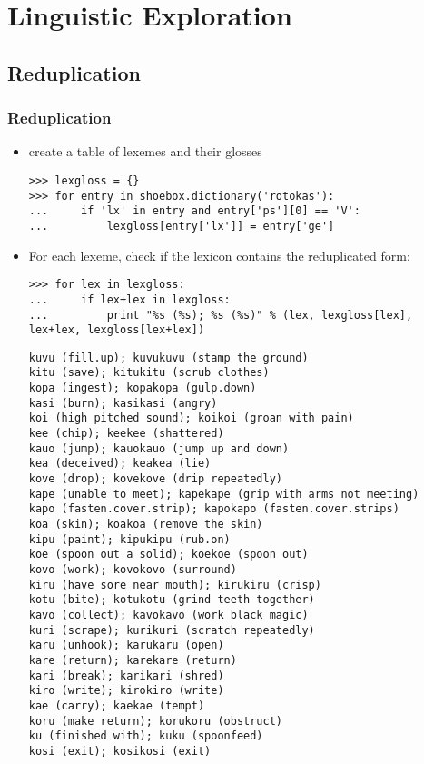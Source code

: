 \documentclass[handout]{beamer}
\begin{document}
\section{Linguistic Exploration}

\subsection{Reduplication}

\begin{frame}[fragile]
\frametitle{Reduplication}
\scriptsize
\begin{itemize}
\item create a table of lexemes and their glosses

\begin{verbatim}
>>> lexgloss = {}
>>> for entry in shoebox.dictionary('rotokas'):
...     if 'lx' in entry and entry['ps'][0] == 'V':
...         lexgloss[entry['lx']] = entry['ge']
\end{verbatim}

\item For each lexeme, check if the lexicon contains the reduplicated form:

\begin{verbatim}
>>> for lex in lexgloss:
...     if lex+lex in lexgloss:
...         print "%s (%s); %s (%s)" % (lex, lexgloss[lex], lex+lex, lexgloss[lex+lex])
\end{verbatim}

\tiny
\begin{verbatim}
kuvu (fill.up); kuvukuvu (stamp the ground)
kitu (save); kitukitu (scrub clothes)
kopa (ingest); kopakopa (gulp.down)
kasi (burn); kasikasi (angry)
koi (high pitched sound); koikoi (groan with pain)
kee (chip); keekee (shattered)
kauo (jump); kauokauo (jump up and down)
kea (deceived); keakea (lie)
kove (drop); kovekove (drip repeatedly)
kape (unable to meet); kapekape (grip with arms not meeting)
kapo (fasten.cover.strip); kapokapo (fasten.cover.strips)
koa (skin); koakoa (remove the skin)
kipu (paint); kipukipu (rub.on)
koe (spoon out a solid); koekoe (spoon out)
kovo (work); kovokovo (surround)
kiru (have sore near mouth); kirukiru (crisp)
kotu (bite); kotukotu (grind teeth together)
kavo (collect); kavokavo (work black magic)
kuri (scrape); kurikuri (scratch repeatedly)
karu (unhook); karukaru (open)
kare (return); karekare (return)
kari (break); karikari (shred)
kiro (write); kirokiro (write)
kae (carry); kaekae (tempt)
koru (make return); korukoru (obstruct)
ku (finished with); kuku (spoonfeed)
kosi (exit); kosikosi (exit)
\end{verbatim}
\end{itemize}
\end{frame}
\end{document}
